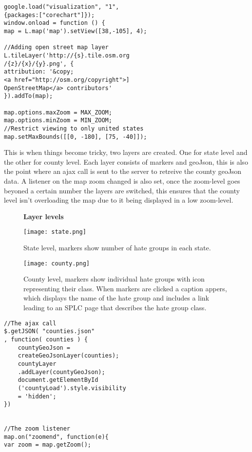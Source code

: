 \documentclass[twoside]{article}
\begin{document}
\begin{multicols}{2}
\begin{verbatim}
google.load("visualization", "1", 
{packages:["corechart"]});
window.onload = function () {
map = L.map('map').setView([38,-105], 4);
        
//Adding open street map layer
L.tileLayer('http://{s}.tile.osm.org
/{z}/{x}/{y}.png', {
attribution: '&copy;
<a href="http://osm.org/copyright">]
OpenStreetMap</a> contributors'
}).addTo(map);

map.options.maxZoom = MAX_ZOOM;
map.options.minZoom = MIN_ZOOM;
//Restrict viewing to only united states 
map.setMaxBounds([[0, -180], [75, -40]]);
\end{verbatim}
This is when things become tricky, two layers are created. One for state level and the other for county level. Each layer consists of markers and geoJson,
this is also the point where an ajax call is sent to the server to retreive the county geoJson data. A listener on the map zoom changed is also set, once the zoom-level goes beyoned a certain number the layers are switched, this ensures that the county level isn't overloading the map due to it 
being displayed in a low zoom-level. 

\begin{figure*} %
\centering
\textbf{Layer levels}\par\medskip
\texttt{[image: state.png]}
\caption 
{State level, markers show number of hate groups in each state.}
\end{figure*}

\begin{figure*} %
\texttt{[image: county.png]}
\caption 
{County level, markers show individual hate groups with icon representing their class. When markers are clicked a caption appers, which displays the name of the hate group and includes a link leading to an SPLC page that describes the hate group class.} 
\end{figure*}

\begin{verbatim}
//The ajax call
$.getJSON( "counties.json"
, function( counties ) {
    countyGeoJson = 
    createGeoJsonLayer(counties);
    countyLayer
    .addLayer(countyGeoJson);
    document.getElementById
    ('countyLoad').style.visibility 
    = 'hidden';
})


//The zoom listener
map.on("zoomend", function(e){
var zoom = map.getZoom();


\end{verbatim}
\end{multicols}
\end{document}

